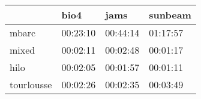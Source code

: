 \begin{tabular}{llll}
\toprule
{} &      bio4 &      jams &   sunbeam \\
\midrule
mbarc      &  00:23:10 &  00:44:14 &  01:17:57 \\
mixed      &  00:02:11 &  00:02:48 &  00:01:17 \\
hilo       &  00:02:05 &  00:01:57 &  00:01:11 \\
tourlousse &  00:02:26 &  00:02:35 &  00:03:49 \\
\bottomrule
\end{tabular}
